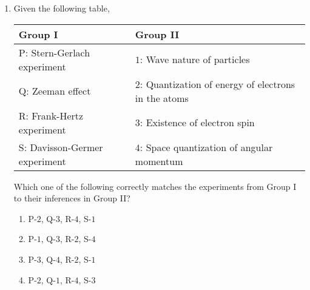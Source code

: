 \documentclass[journal,12pt,twocolumn]{IEEEtran}
\theoremstyle{remark}
\begin{document}
\begin{enumerate}[start=1]
\begin{enumerate}
\item
{}

\item
{}

\end{enumerate}



\item Given the following table,

\begin{table}[h!]
    \centering
    \begin{tabular}{|p{3cm}|p{5cm}|}
        \hline
        \textbf{Group I} &  \textbf{Group II}  \\ \hline
        P: Stern-Gerlach experiment & $1$: Wave nature of particles \\ \hline
        Q:  Zeeman effect & $2$: Quantization of energy of electrons in the atoms \\ \hline
        R:  Frank-Hertz experiment & $3$: Existence of electron spin \\ \hline
        S: Davisson-Germer experiment & $4$: Space quantization of angular momentum \\ \hline
    \end{tabular}
\end{table}
Which one of the following correctly matches the experiments from Group I to their inferences in Group II?
\begin{enumerate}
    \item P-$2$, Q-$3$, R-$4$, S-$1$
    \item P-$1$, Q-$3$, R-$2$, S-$4$
    \item P-$3$, Q-$4$, R-$2$, S-$1$
    \item P-$2$, Q-$1$, R-$4$, S-$3$
\end{enumerate}


\end{enumerate}
\end{document}
